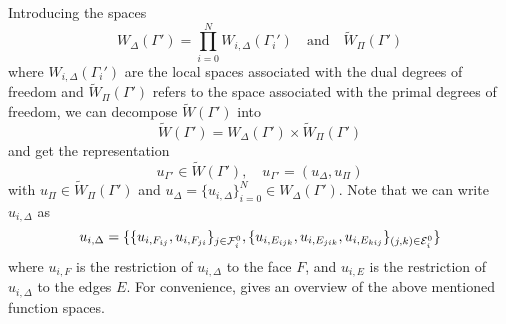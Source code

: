Introducing the spaces
\[W_{\Delta}(\Gamma') = \prod_{i = 0}^N W_{i, \Delta}(\Gamma_i') \quad\text{and}\quad \widetilde W_{\Pi}(\Gamma')\]
where $W_{i,\Delta}(\Gamma_i')$ are the local spaces associated with the dual degrees of freedom and $\widetilde W_{\Pi}(\Gamma')$ refers to the space associated with the primal degrees of freedom, we can decompose $\widetilde W(\Gamma')$ into
\[\widetilde W(\Gamma') = W_{\Delta}(\Gamma') \times \widetilde W_{\Pi}(\Gamma')\]
and get the representation
\[u_{\Gamma'} \in \widetilde W(\Gamma'), \quad u_{\Gamma'} = (u_{\Delta}, u_{\Pi})\]
with $u_{\Pi} \in \widetilde W_{\Pi}(\Gamma')$ and $u_{\Delta} = \{u_{i, \Delta}\}_{i = 0}^N \in W_{\Delta}(\Gamma')$. Note that we can write $u_{i, \Delta}$ as
\[u_{i, \Delta} = \{\{u_{i, F_{ij}}, u_{i, F_{ji}}\}_{j \in \mathcal{F}_i^0}, \{u_{i, E_{ijk}}, u_{i, E_{jik}}, u_{i, E_{kij}}\}_{(j, k) \in \mathcal{E}_i^0}\}\]
where $u_{i, F}$ is the restriction of $u_{i, \Delta}$ to the face $F$, and $u_{i, E}$ is the restriction of $u_{i, \Delta}$ to the edges $E$. For convenience,  gives an overview of the above mentioned function spaces.

